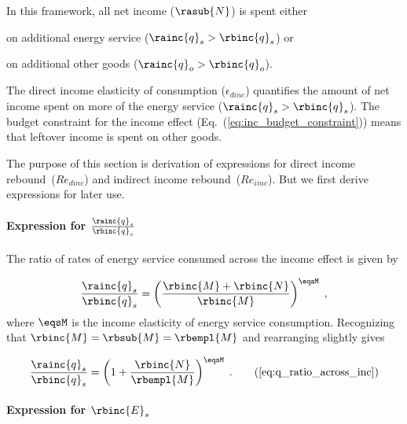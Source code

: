 In this framework, all net income ($\rasub{N}$) is spent either 
%
\begin{enumerate*}[label={(\alph*)}]
	
  \item on additional energy service ($\rainc{q}_s > \rbinc{q}_s$) or
  
  \item on additional other goods ($\rainc{q}_o > \rbinc{q}_o$).
    
\end{enumerate*}
%
The direct income elasticity of consumption ($\epsilon_{dinc}$) 
quantifies the amount of net income spent 
on more of the energy service ($\rainc{q}_s > \rbinc{q}_s$).
The budget constraint for the income effect (Eq.~(\ref{eq:inc_budget_constraint})) 
means that leftover income is spent on other goods.

The purpose of this section is derivation of expressions for 
direct income rebound~($Re_{dinc}$) and indirect income rebound~($Re_{iinc}$).
But we first derive expressions for later use.


\paragraph{Expression for $\frac{\rainc{q}_s}{\rbinc{q}_s}$}
\label{sec:qs_ratio}

The ratio of rates of energy service consumed across the income effect is given by

\begin{equation}
  \frac{\rainc{q}_s}{\rbinc{q}_s} = \left( \frac{\rbinc{M} + \rbinc{N}}{\rbinc{M}} \right) ^ {\eqsM} \; ,
\end{equation}
%
where $\eqsM$ is the income elasticity of energy service consumption.
Recognizing that $\rbinc{M} = \rbsub{M} = \rbempl{M}$ and rearranging slightly gives

\begin{equation}
  \frac{\rainc{q}_s}{\rbinc{q}_s} = \left( 1 + \frac{\rbinc{N}}{\rbempl{M}} \right) ^ {\eqsM} \; . 
                                                                                \tag{\ref{eq:q_ratio_across_inc}}
\end{equation}


\paragraph{Expression for $\rbinc{E}_s$} 
\label{sec:E_dot_s_hat_expression}

